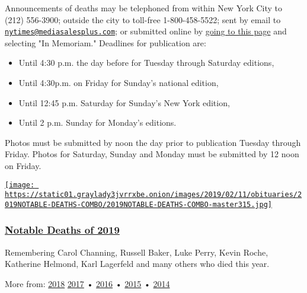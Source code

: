 Announcements of deaths may be telephoned from within New York City to
(212) 556-3900; outside the city to toll-free 1-800-458-5522; sent by
email to
\href{mailto:nytimes@mediasalesplus.com}{\nolinkurl{nytimes@mediasalesplus.com}};
or submitted online by
\href{https://advertising.nytimes3xbfgragh.onion/irj/go/nyt/prtroot/fwk/classified}{going
to this page} and selecting "In Memoriam." Deadlines for publication
are:

\begin{itemize}
\tightlist
\item
  Until 4:30 p.m. the day before for Tuesday through Saturday editions,
\item
  Until 4:30p.m. on Friday for Sunday's national edition,
\item
  Until 12:45 p.m. Saturday for Sunday's New York edition,
\item
  Until 2 p.m. Sunday for Monday's editions.
\end{itemize}

Photos must be submitted by noon the day prior to publication Tuesday
through Friday. Photos for Saturday, Sunday and Monday must be submitted
by 12 noon on Friday.

\href{https://www.nytimes3xbfgragh.onion/interactive/2019/obituaries/notable-deaths.html}{\texttt{[image: https://static01.graylady3jvrrxbe.onion/images/2019/02/11/obituaries/2019NOTABLE-DEATHS-COMBO/2019NOTABLE-DEATHS-COMBO-master315.jpg]}}

\hypertarget{notable-deaths-of-2019}{%
\subsubsection{\texorpdfstring{\href{https://www.nytimes3xbfgragh.onion/interactive/2019/obituaries/notable-deaths.html}{Notable
Deaths of 2019}}{Notable Deaths of 2019}}\label{notable-deaths-of-2019}}

Remembering Carol Channing, Russell Baker, Luke Perry, Kevin Roche,
Katherine Helmond, Karl Lagerfeld and many others who died this year.

More from:
\href{https://www.nytimes3xbfgragh.onion/interactive/2018/obituaries/notable-deaths.html}{2018}
\href{https://www.nytimes3xbfgragh.onion/interactive/projects/notable-deaths/2017}{2017}
•
\href{https://www.nytimes3xbfgragh.onion/interactive/projects/notable-deaths/2016}{2016}
•
\href{https://www.nytimes3xbfgragh.onion/interactive/2015/obituaries/notable-deaths-2015.html}{2015}
•
\href{https://www.nytimes3xbfgragh.onion/interactive/2014/obituaries/notable-deaths-2014.html}{2014}

